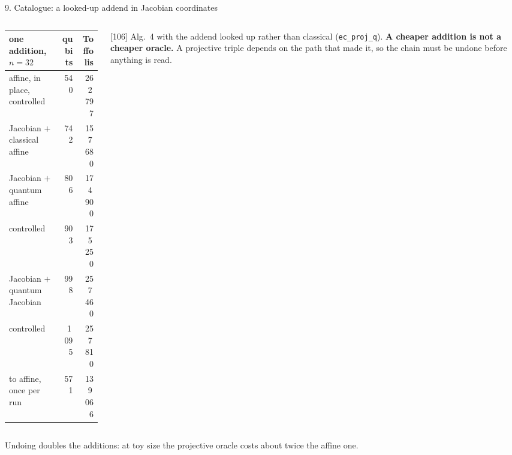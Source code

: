 \documentclass[aspectratio=169,11pt]{beamer}
\begin{document}
\setcounter{framenumber}{199}
\begin{frame}{9. Catalogue: a looked-up addend in Jacobian coordinates}
  \begin{columns}[T]
    \begin{column}{0.54\textwidth}
      \centering\footnotesize
      \renewcommand{\arraystretch}{1.1}
      \begin{tabular}{@{}lrr@{}}
        \toprule
        one addition, $n=32$ & qubits & Toffolis \\
        \midrule
        affine, in place, controlled & 540 & 262\,797 \\
        Jacobian $+$ classical affine & 742 & 157\,680 \\
        Jacobian $+$ quantum affine & 806 & 174\,900 \\
        \quad controlled & 903 & 175\,250 \\
        Jacobian $+$ quantum Jacobian & 998 & 257\,460 \\
        \quad controlled & 1\,095 & 257\,810 \\
        \midrule
        to affine, once per run & 571 & 139\,066 \\
        \bottomrule
      \end{tabular}
    \end{column}
    \begin{column}{0.42\textwidth}
      \small [106] Alg.~4 with the addend looked up rather than classical (\texttt{ec\_proj\_q}).
      \vskip2mm
      \textbf{A cheaper addition is not a cheaper oracle.} A projective triple depends on the path that made it, so the chain must be undone before anything is read.
    \end{column}
  \end{columns}
  \vskip3mm
  \centering
  \par
  {\scriptsize Undoing doubles the additions: at toy size the projective oracle costs about twice the affine one.}
\end{frame}
\end{document}
